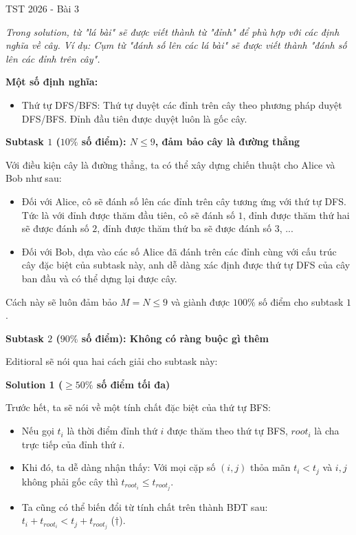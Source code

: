 \begin{tutorial}{TST 2026 - Bài 3}

\textit{Trong solution, từ "lá bài" sẽ được viết thành từ "đỉnh" để phù hợp với các định nghĩa về cây. Ví dụ: Cụm từ "đánh số lên các lá bài" sẽ được viết thành "đánh số lên các đỉnh trên cây".}

\textbf{Một số định nghĩa:}
\begin{itemize}
   \item Thứ tự DFS/BFS: Thứ tự duyệt các đỉnh trên cây theo phương pháp duyệt DFS/BFS. Đỉnh đầu tiên được duyệt luôn là gốc cây.
\end{itemize}

\textbf{Subtask $1$ ($10\%$ số điểm): $N\le 9$, đảm bảo cây là đường thẳng}

Với điều kiện cây là đường thẳng, ta có thể xây dựng chiến thuật cho Alice và Bob như sau:
\begin{itemize}
   \item Đối với Alice, cô sẽ đánh số lên các đỉnh trên cây tương ứng với thứ tự DFS. Tức là với đỉnh được thăm đầu tiên, cô sẽ đánh số $1$, đỉnh được thăm thứ hai sẽ được đánh số $2$, đỉnh được thăm thứ ba sẽ được đánh số $3$, ...
   \item Đối với Bob, dựa vào các số Alice đã đánh trên các đỉnh cùng với cấu trúc cây đặc biệt của subtask này, anh dễ dàng xác định được thứ tự DFS của cây ban đầu và có thể dựng lại được cây.
\end{itemize}

Cách này sẽ luôn đảm bảo $M=N\le 9$ và giành được $100\%$ số điểm cho subtask $1$.

\textbf{Subtask $2$ ($90\%$ số điểm): Không có ràng buộc gì thêm}

Editioral sẽ nói qua hai cách giải cho subtask này:

\textbf{Solution 1 ($\ge 50\%$ số điểm tối đa)}

Trước hết, ta sẽ nói về một tính chất đặc biệt của thứ tự BFS:
\begin{itemize}
   \item Nếu gọi $t_i$ là thời điểm đỉnh thứ $i$ được thăm theo thứ tự BFS, $root_i$ là cha trực tiếp của đỉnh thứ $i$.
   \item Khi đó, ta dễ dàng nhận thấy: Với mọi cặp số $(i,j)$ thỏa mãn $t_i<t_j$ và $i,j$ không phải gốc cây thì $t_{root_i}\le t_{root_j}$.
   \item Ta cũng có thể biến đổi từ tính chất trên thành BĐT sau: $t_i+t_{root_i}<t_j+t_{root_j}$ ($\dagger$).
\end{itemize}


\end{tutorial}
